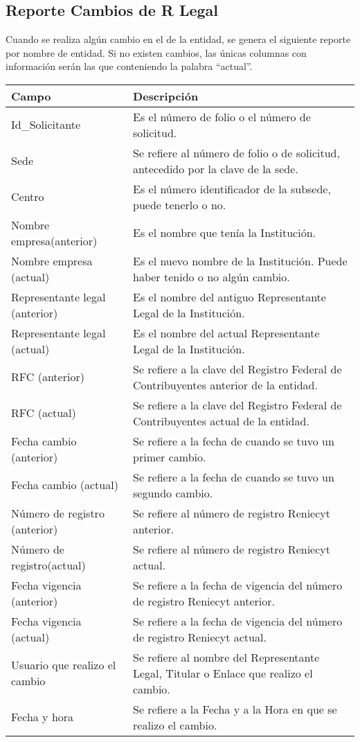 \newpage
\subsection{Reporte Cambios de R Legal}
\label{appendix:Reportes:PeopleSoft:ReporteCambiosRLegal}

Cuando se realiza algún cambio en el  de la entidad, se genera el siguiente reporte por nombre de entidad. Si no existen cambios, las únicas columnas con información serán las que conteniendo la palabra ``actual''.\\

\begin{tabular}{ m{} m{}  }%
	\rowcolor{gray1} {\bf Campo} &  {\bf Descripción} \\ \hline \hline

	Id\_Solicitante & Es el número de folio o el número de solicitud.\\
	\rowcolor{gray1}Sede & Se refiere al número de folio o de solicitud, antecedido por la clave de la sede.\\
	Centro & Es el número identificador de la subsede, puede tenerlo o no.\\
	\rowcolor{gray1}Nombre empresa(anterior) & Es el nombre que tenía la Institución.\\
	Nombre empresa (actual) & Es el nuevo nombre de la Institución. Puede haber tenido o no algún cambio.\\
	\rowcolor{gray1}Representante legal (anterior) & Es el nombre del antiguo Representante Legal de la Institución.\\
	Representante legal (actual) & Es el nombre del actual Representante Legal de la Institución.\\
	\rowcolor{gray1}RFC (anterior) & Se refiere a la clave del Registro Federal de Contribuyentes anterior de la entidad.\\
	RFC (actual) & Se refiere a la clave del Registro Federal de Contribuyentes actual de la entidad.\\
	\rowcolor{gray1}Fecha cambio (anterior) & Se refiere a la fecha de cuando se tuvo un primer cambio.\\
	Fecha cambio (actual) & Se refiere a la fecha de cuando se tuvo un segundo cambio.\\
	\rowcolor{gray1}Número de registro (anterior) & Se refiere al número de registro Reniecyt anterior.\\
	Número de registro(actual) & Se refiere al número de registro Reniecyt actual.\\
	\rowcolor{gray1}Fecha vigencia (anterior) & Se refiere a la fecha de vigencia del número de registro Reniecyt anterior.\\
	Fecha vigencia (actual) & Se refiere a la fecha de vigencia del número de registro Reniecyt actual.\\
	\rowcolor{gray1}Usuario que realizo el cambio & Se refiere al nombre del Representante Legal, Titular o Enlace que realizo el cambio.\\
	Fecha y hora & Se refiere a la Fecha y a la Hora en que se realizo el cambio.\\
\end{tabular}
